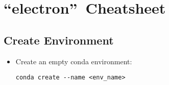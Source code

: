 \section{\textquotedblleft electron\textquotedblright\ Cheatsheet}



\subsection{Create Environment}

\begin{itemize}
    \item Create an empty conda environment:
    \begin{verbatim}
conda create --name <env_name>
    \end{verbatim}
\end{itemize}
